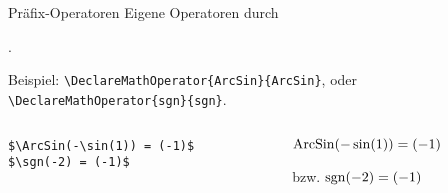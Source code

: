 \begin{frame}[fragile]{Präfix-Operatoren}
Eigene Operatoren durch
\begin{center}
.
\end{center}
Beispiel:  \verb+\DeclareMathOperator{ArcSin}{ArcSin}+, oder \verb+\DeclareMathOperator{sgn}{sgn}+\pause.
\begin{columns}
\begin{column}{0.55\textwidth}
\begin{codeblock}
\begin{verbatim}
$\ArcSin(-\sin(1)) = (-1)$ 
$\sgn(-2) = (-1)$
\end{verbatim}
\end{codeblock}
\end{column}
\begin{column}{0.4\textwidth}
${\operatorname{ArcSin}(-\sin(1)) = (-1)}$ 

bzw. $\operatorname{sgn}(-2) = (-1)$
\end{column}
\end{columns}
\end{frame}